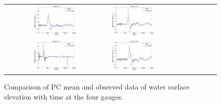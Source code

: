 \documentclass[review,12pt]{elsarticle}
\begin{document}
\begin{figure}[ht]
\begin{tabular}{clc}
%        
\includegraphics[width=0.475\textwidth]{Figure8a.pdf} &
\includegraphics[width=0.475\textwidth]{Figure8b.pdf} \\
\includegraphics[width=0.475\textwidth]{Figure8c.pdf} &
\includegraphics[width=0.475\textwidth]{Figure8d.pdf}
\end{tabular}
\caption{Comparison of PC mean 
and observed data of water surface elevation with time at the four gauges.}
\label{fig:compare}
\end{figure}  
\end{document}
